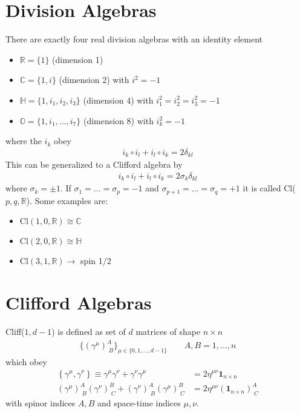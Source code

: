 \documentclass[../main.tex]{subfiles}
\begin{document}
\section{Division Algebras}
There are exactly four real division algebras with an identity element
\begin{itemize}
\item $\mathbb{R}=\{1\}$ (dimension 1)
\item $\mathbb{C}=\{1,i\}$ (dimension 2) with $i^2=-1$
\item $\mathbb{H}=\{1,i_1,i_2,i_3\}$  (dimension 4) with $i_1^2=i_2^2=i_3^2=-1$
\item $\mathbb{O}=\{1,i_1,...,i_7\}$ (dimension 8) with $i_k^2=-1$
\end{itemize}
where the $i_k$ obey
\begin{align}
i_k\circ i_l + i_l\circ i_k = 2\delta_{kl}
\end{align}
This can be generalized to a Clifford algebra by
\begin{align}
i_k\circ i_l + i_l\circ i_k = 2\sigma_k\delta_{kl}
\end{align}
where $\sigma_k=\pm1$. If $\sigma_1=...=\sigma_p=-1$ and $\sigma_{p+1}=...=\sigma_q=+1$ it is called Cl($p,q,\mathbb{R}$). Some examples are:
\begin{itemize}
\item $\text{Cl}(1,0,\mathbb{R})\cong\mathbb{C}$
\item $\text{Cl}(2,0,\mathbb{R})\cong\mathbb{H}$
\item $\text{Cl}(3,1,\mathbb{R})\rightarrow$ spin 1/2
\end{itemize}




\section{Clifford Algebras}
Cliff($1,d-1$) is defined as set of $d$ matrices of shape $n\times n$
\begin{align}
\{(\gamma^\mu)^A_{\;B}\}_{\mu\in\{0,1,...,d-1\}}\qquad A,B=1,...,n
\end{align}
which obey
\begin{align}
\left\{\gamma^\mu,\gamma^\nu\right\}\equiv\gamma^\mu\gamma^\nu+\gamma^\nu\gamma^\mu&=2\eta^{\mu\nu}\mathbf{1}_{n\times n}\\
(\gamma^\mu)^A_{\;B}(\gamma^\nu)^B_{\;C}+(\gamma^\nu)^A_{\;B}(\gamma^\mu)^B_{\;C}&=2\eta^{\mu\nu}(\mathbf{1}_{n\times n})^A_{\;C}
\end{align}
with spinor indices $A, B$ and space-time indices $\mu, \nu$.
\end{document}
